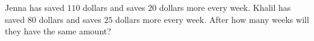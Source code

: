 Jenna has saved $110$ dollars and saves $20$ dollars more every week. Khalil has saved $80$ dollars and saves $25$ dollars more every week. After how many weeks will they have the same amount?
